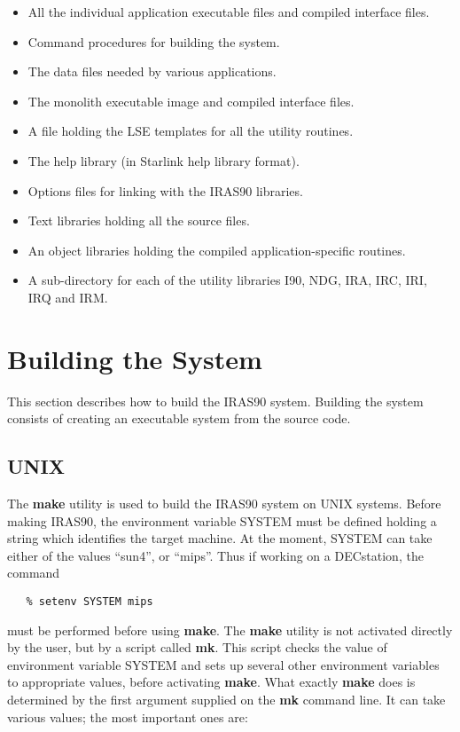 \begin{itemize}
\item All the individual application executable files and compiled interface
files.
\item Command procedures for building the system.
\item The data files needed by various applications.
\item The monolith executable image and compiled interface files.
\item A file holding the {\small LSE} templates for all the utility routines.
\item The help library (in Starlink help library format).
\item Options files for linking with the {\small IRAS90} libraries.
\item Text libraries holding all the source files.
\item An object libraries holding the compiled application-specific routines.
\item A sub-directory for each of the utility libraries {\small I90, NDG, IRA,
IRC, IRI, IRQ} and {\small IRM}.
\end{itemize}

\section{Building the System}
\label{SEC:BUILD}
This section describes how to build the {\small IRAS90} system. Building the
system consists of creating an executable system from the source code.

\subsection{UNIX}
The {\bf make} utility is used to build the {\small IRAS90} system on {\small
UNIX} systems. Before making {\small IRAS90}, the environment variable {\small
SYSTEM} must be defined holding a string which identifies the target machine.
At the moment, {\small SYSTEM} can take either of the values ``sun4'', or
``mips''. Thus if working on a DECstation, the command

\small
\begin{verbatim}
   % setenv SYSTEM mips
\end{verbatim}
\normalsize

must be performed before using {\bf make}. The {\bf make} utility is not
activated directly by the user, but by a script called {\bf mk}. This script
checks the value of environment variable {\small SYSTEM} and sets up several
other environment variables to appropriate values, before activating {\bf make}.
What exactly {\bf make} does is determined by the first argument supplied on the
{\bf mk} command line. It can take various values; the most important ones are:

